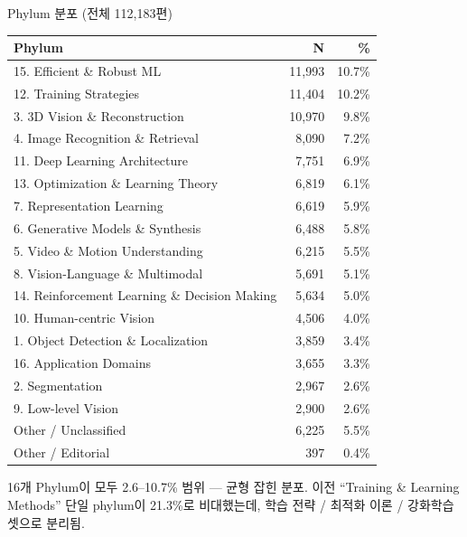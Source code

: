 \documentclass[aspectratio=169,t]{beamer}
\newcommand{\muted}[1]{\textcolor{mutedgray}{#1}}
\begin{document}
\begin{frame}{Phylum 분포 (전체 112{,}183편)}
\centering\scriptsize
\begin{tabular}{@{}lrr@{}}
\toprule
\textbf{Phylum} & \textbf{N} & \textbf{\%} \\
\midrule
15. Efficient \& Robust ML                   & 11{,}993 & 10.7\% \\
12. Training Strategies                      & 11{,}404 & 10.2\% \\
3. 3D Vision \& Reconstruction               & 10{,}970 & 9.8\% \\
4. Image Recognition \& Retrieval            &  8{,}090 & 7.2\% \\
11. Deep Learning Architecture               &  7{,}751 & 6.9\% \\
13. Optimization \& Learning Theory          &  6{,}819 & 6.1\% \\
7. Representation Learning                   &  6{,}619 & 5.9\% \\
6. Generative Models \& Synthesis            &  6{,}488 & 5.8\% \\
5. Video \& Motion Understanding             &  6{,}215 & 5.5\% \\
8. Vision-Language \& Multimodal             &  5{,}691 & 5.1\% \\
14. Reinforcement Learning \& Decision Making&  5{,}634 & 5.0\% \\
10. Human-centric Vision                     &  4{,}506 & 4.0\% \\
1. Object Detection \& Localization          &  3{,}859 & 3.4\% \\
16. Application Domains                      &  3{,}655 & 3.3\% \\
2. Segmentation                              &  2{,}967 & 2.6\% \\
9. Low-level Vision                          &  2{,}900 & 2.6\% \\
\midrule
Other / Unclassified                         &  6{,}225 & 5.5\% \\
Other / Editorial                            &    397   & 0.4\% \\
\bottomrule
\end{tabular}
\vfill
\muted{16개 Phylum이 모두 2.6--10.7\% 범위 — 균형 잡힌 분포. 이전 ``Training \& Learning Methods'' 단일 phylum이 21.3\%로 비대했는데, 학습 전략 / 최적화 이론 / 강화학습 셋으로 분리됨.}
\end{frame}
\end{document}
